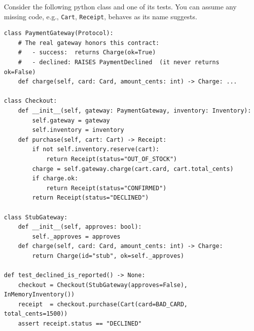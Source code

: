\documentclass[addpoints, answers]{exam}
\newcommand{\Code}[1]{\texttt{#1}}
\begin{document}
\begin{questions}
\begin{parts}
\end{parts}
\newpage

\question Consider the following python class and one of its
  tests. You can assume any missing code, e.g., \Code{Cart},
  \Code{Receipt}, behaves as its name suggests.
  \begin{verbatim}
class PaymentGateway(Protocol):
    # The real gateway honors this contract:
    #   - success:  returns Charge(ok=True)
    #   - declined: RAISES PaymentDeclined  (it never returns ok=False)
    def charge(self, card: Card, amount_cents: int) -> Charge: ...

class Checkout:
    def __init__(self, gateway: PaymentGateway, inventory: Inventory):
        self.gateway = gateway
        self.inventory = inventory
    def purchase(self, cart: Cart) -> Receipt:
        if not self.inventory.reserve(cart):
            return Receipt(status="OUT_OF_STOCK")
        charge = self.gateway.charge(cart.card, cart.total_cents)
        if charge.ok:
            return Receipt(status="CONFIRMED")
        return Receipt(status="DECLINED")

class StubGateway:
    def __init__(self, approves: bool):
        self._approves = approves
    def charge(self, card: Card, amount_cents: int) -> Charge:
        return Charge(id="stub", ok=self._approves)

def test_declined_is_reported() -> None:
    checkout = Checkout(StubGateway(approves=False), InMemoryInventory())
    receipt  = checkout.purchase(Cart(card=BAD_CARD, total_cents=1500))
    assert receipt.status == "DECLINED"
\end{verbatim}

\end{questions}
\end{document}
